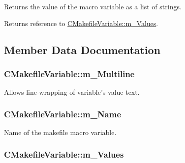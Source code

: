 Returns the value of the macro variable as a list of strings. 

\begin{DoxyReturn}{Returns}
reference to \hyperlink{classCMakefileVariable_a73a07150ed0c365061d5436a40959e33}{C\-Makefile\-Variable\-::m\-\_\-\-Values}. 
\end{DoxyReturn}


\subsection{Member Data Documentation}
\hypertarget{classCMakefileVariable_adf528f9e7b68a9d9846d82b75266bc2b}{
\subsubsection[{m\-\_\-\-Multiline}]{\setlength{\rightskip}{0pt plus 5cm}C\-Makefile\-Variable\-::m\-\_\-\-Multiline\hspace{0.3cm}{\ttfamily [private]}}}\label{classCMakefileVariable_adf528f9e7b68a9d9846d82b75266bc2b}


Allows line-\/wrapping of variable's value text. 

\hypertarget{classCMakefileVariable_af46c1f28a1592a7ae46def219ba676ba}{
\subsubsection[{m\-\_\-\-Name}]{\setlength{\rightskip}{0pt plus 5cm}C\-Makefile\-Variable\-::m\-\_\-\-Name\hspace{0.3cm}{\ttfamily [private]}}}\label{classCMakefileVariable_af46c1f28a1592a7ae46def219ba676ba}


Name of the makefile macro variable. 

\hypertarget{classCMakefileVariable_a73a07150ed0c365061d5436a40959e33}{
\subsubsection[{m\-\_\-\-Values}]{\setlength{\rightskip}{0pt plus 5cm}C\-Makefile\-Variable\-::m\-\_\-\-Values\hspace{0.3cm}{\ttfamily [private]}}}\label{classCMakefileVariable_a73a07150ed0c365061d5436a40959e33}


